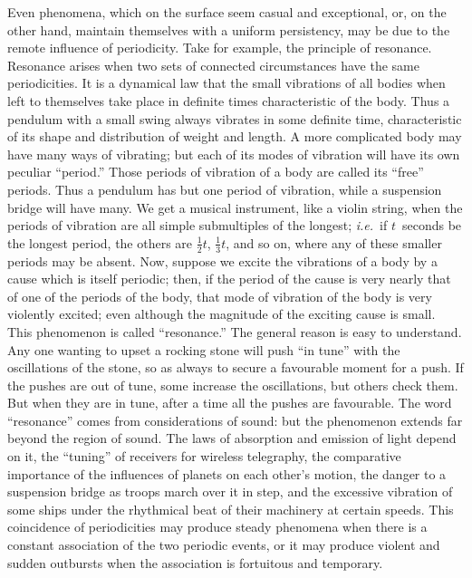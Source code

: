 \documentclass[12pt,leqno]{book}[2005/09/16]
\newcommand{\PageSep}[1]{\ignorespaces}
\newcommand{\ie}{\emph{i.e.}}
\begin{document}
Even phenomena, which on the surface
seem casual and exceptional, or, on the other
hand, maintain themselves with a uniform
persistency, may be due to the remote influence
of periodicity. Take for example, the
\PageSep{170}
principle of resonance. Resonance arises
%
when two sets of connected circumstances
have the same periodicities. It is a dynamical
law that the small vibrations of all bodies
when left to themselves take place in definite
times characteristic of the body. Thus a
pendulum with a small swing always vibrates
in some definite time, characteristic of its shape
and distribution of weight and length. A more
complicated body may have many ways of
vibrating; but each of its modes of vibration
will have its own peculiar ``period.'' Those
%
periods of vibration of a body are called its
``free'' periods. Thus a pendulum has but
one period of vibration, while a suspension
bridge will have many. We get a musical
instrument, like a violin string, when the
periods of vibration are all simple submultiples
of the longest; \ie~if $t$~seconds be the longest
period, the others are $\frac{1}{2}t$, $\frac{1}{3}t$, and so on, where
any of these smaller periods may be absent.
Now, suppose we excite the vibrations of a
body by a cause which is itself periodic;
then, if the period of the cause is very nearly
that of one of the periods of the body, that
mode of vibration of the body is very violently
excited; even although the magnitude of the
exciting cause is small. This phenomenon is
called ``resonance.'' The general reason is
easy to understand. Any one wanting to
upset a rocking stone will push ``in tune''
\PageSep{171}
with the oscillations of the stone, so as always
to secure a favourable moment for a push.
If the pushes are out of tune, some increase
the oscillations, but others check them. But
when they are in tune, after a time all the
pushes are favourable. The word ``resonance''
%
comes from considerations of sound:
but the phenomenon extends far beyond the
region of sound. The laws of absorption and
emission of light depend on it, the ``tuning''
of receivers for wireless telegraphy, the comparative
importance of the influences of
planets on each other's motion, the danger
to a suspension bridge as troops march over
it in step, and the excessive vibration of some
ships under the rhythmical beat of their
machinery at certain speeds. This coincidence
of periodicities may produce steady
phenomena when there is a constant association
of the two periodic events, or it may
produce violent and sudden outbursts when
the association is fortuitous and temporary.
\end{document}
